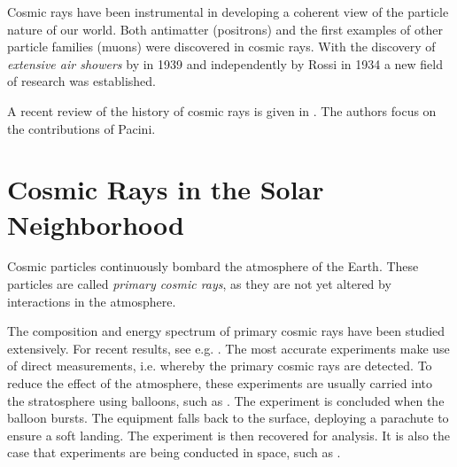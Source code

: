 Cosmic rays have been instrumental in developing a coherent view of the particle
nature of our world.  Both antimatter (positrons) and the first examples of
other particle families (muons) were discovered in cosmic rays.  With the
discovery of \emph{extensive air showers} by \textcite{Auger:1939} in 1939 and
independently by Rossi \cite[5]{Rao:1998} in 1934 a new field of research was
established.

A recent review of the history of cosmic rays is given in \cite{Carlson:2011}.
The authors focus on the contributions of Pacini.


\section{Cosmic Rays in the Solar Neighborhood}
\label{sec:solar-neighborhood}

Cosmic particles continuously bombard the atmosphere of the Earth.  These
particles are called \emph{primary cosmic rays}, as they are not yet altered by
interactions in the atmosphere.

The composition and energy spectrum of primary cosmic rays have been studied
extensively.  For recent results, see e.g.
\cites{Takeda:2003}{Apel:2009}{Abraham:2010}{Bird:1993}. The most accurate
experiments make use of direct measurements, i.e. whereby the primary cosmic rays are
detected. To reduce the effect of the atmosphere, these experiments are usually
carried into the stratosphere using balloons, such as \cite{Boyle:2008}.  The
experiment is concluded when the balloon bursts.  The equipment falls back to
the surface, deploying a parachute to ensure a soft landing.  The experiment is
then recovered for analysis. It is also the case that experiments are being
conducted in space, such as \cite{George:2009}.

